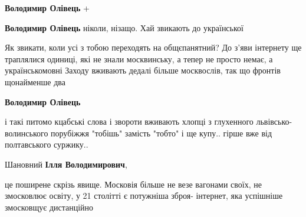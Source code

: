 \begin{itemize}
\begin{itemize}
 
\textbf{Володимир Олівець} +

 
\textbf{Володимир Олівець} ніколи, нізащо. Хай звикають до української

 

Як звикати, коли усі з тобою переходять на общєпанятний? До з'яви інтернету ще
траплялися одиниці, які не знали москвинську, а тепер не просто немає, а
українськомовні Заходу вживають дедалі більше москвослів, так що фронтів
щонайменше два


 
\textbf{Володимир Олівець} 

і такі питомо кцабські слова і звороти вживають хлопці з глухенного
львівсько-волинського порубіжжя "тобішь" замість "тобто" і ще купу.. гірше вже
від полтавського суржику..


 

Шановний \textbf{Ілля Володимирович}, 

це поширене скрізь явище. Московія більше не везе вагонами своїх, не змосковлює
освіту, у 21 столітті є потужніша зброя- інтернет, яка успішніше змосковщує
дистанційно
\end{itemize}


\end{itemize}
